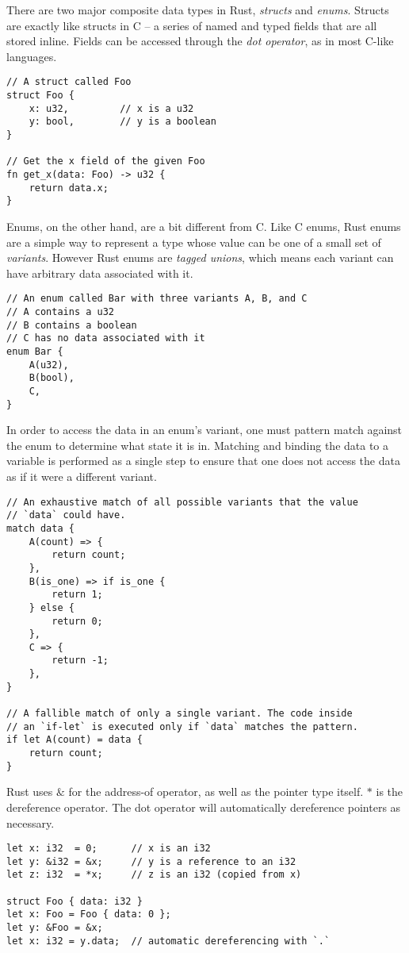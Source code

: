 There are two major composite data types in Rust, \emph{structs} and \emph{enums}.
Structs are exactly like structs in C -- a series of named and typed fields that
are all stored inline. Fields can be accessed through the \emph{dot operator},
as in most C-like languages.

\begin{verbatim}
// A struct called Foo
struct Foo {
    x: u32,         // x is a u32
    y: bool,        // y is a boolean
}

// Get the x field of the given Foo
fn get_x(data: Foo) -> u32 {
    return data.x;
}
\end{verbatim}

Enums, on the other hand, are a bit different from C.
Like C enums, Rust enums are a simple way to represent a type whose value can be
one of a small set of \emph{variants}. However Rust enums are
\emph{tagged unions}, which means each variant can have arbitrary data associated
with it.

\begin{verbatim}
// An enum called Bar with three variants A, B, and C
// A contains a u32
// B contains a boolean
// C has no data associated with it
enum Bar {
    A(u32),
    B(bool),
    C,
}
\end{verbatim}

In order to access the data in an enum's variant, one must pattern match against
the enum to determine what state it is in. Matching and binding the data to a variable
is performed as a single step to ensure that one does not access the data as if it
were a different variant.

\begin{verbatim}
// An exhaustive match of all possible variants that the value
// `data` could have.
match data {
    A(count) => {
        return count;
    },
    B(is_one) => if is_one {
        return 1;
    } else {
        return 0;
    },
    C => {
        return -1;
    },
}

// A fallible match of only a single variant. The code inside
// an `if-let` is executed only if `data` matches the pattern.
if let A(count) = data {
    return count;
}
\end{verbatim}

Rust uses $\&$ for the address-of operator, as well as the pointer type
itself. $*$ is the dereference operator. The dot operator will automatically
dereference pointers as necessary.

\begin{verbatim}
let x: i32  = 0;      // x is an i32
let y: &i32 = &x;     // y is a reference to an i32
let z: i32  = *x;     // z is an i32 (copied from x)

struct Foo { data: i32 }
let x: Foo = Foo { data: 0 };
let y: &Foo = &x;
let x: i32 = y.data;  // automatic dereferencing with `.`

\end{verbatim}





